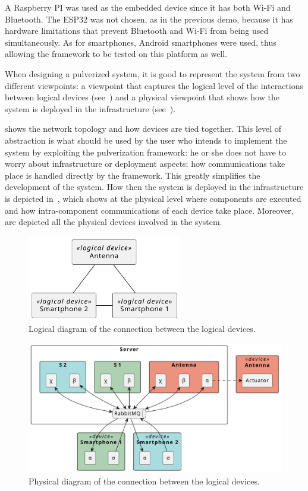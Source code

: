 A Raspberry PI was used as the embedded device since it has both Wi-Fi and Bluetooth. The ESP32 was not chosen, as in the previous demo, because it
has hardware limitations that prevent Bluetooth and Wi-Fi from being used simultaneously. As for smartphones, Android smartphones were used, thus
allowing the framework to be tested on this platform as well.

When designing a pulverized system, it is good to represent the system from two different viewpoints: a viewpoint that captures the logical level
of the interactions between logical devices (see~) and a physical viewpoint that shows how the system is deployed in
the infrastructure (see~).

 shows the network topology and how devices are tied together. This level of abstraction is what should be used by
the user who intends to implement the system by exploiting the pulverization framework: he or she does not have to worry about infrastructure or
deployment aspects; how communications take place is handled directly by the framework. This greatly simplifies the development of the system. How
then the system is deployed in the infrastructure is depicted in~, which shows at the physical level where
components are executed and how intra-component communications of each device take place. Moreover, are depicted all the physical devices involved in
the system.

\begin{figure}
	\centering
	\includegraphics[width=0.6\textwidth]{figures/demo2-logical-device.pdf}
	\caption{Logical diagram of the connection between the logical devices.}
	\label{fig:demo-2-logical-diagram}
\end{figure}

\begin{figure}
	\centering
	\includegraphics[width=\textwidth]{figures/demo2-physical.pdf}
	\caption{Physical diagram of the connection between the logical devices.}
	\label{fig:demo-2-physical-diagram}
\end{figure}

